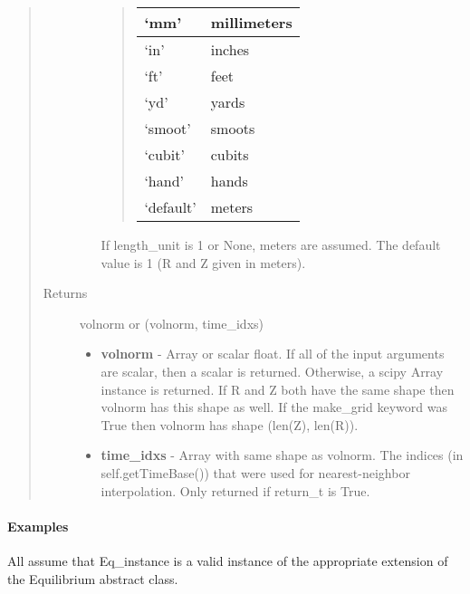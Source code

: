 \documentclass[letterpaper,10pt,english]{sphinxmanual}
\begin{document}
\begin{fulllineitems}
\begin{fulllineitems}
\begin{quote}
\begin{description}
\begin{itemize}
\begin{quote}
\begin{tabulary}{\linewidth}{|L|L|}
`mm'
 & 
millimeters
\\\hline

`in'
 & 
inches
\\\hline

`ft'
 & 
feet
\\\hline

`yd'
 & 
yards
\\\hline

`smoot'
 & 
smoots
\\\hline

`cubit'
 & 
cubits
\\\hline

`hand'
 & 
hands
\\\hline

`default'
 & 
meters
\\\hline
\end{tabulary}

\end{quote}

If length\_unit is 1 or None, meters are assumed. The default
value is 1 (R and Z given in meters).

\end{itemize}

\item[{Returns}] \leavevmode

volnorm or (volnorm, time\_idxs)
\begin{itemize}
\item {} 
\textbf{volnorm} - Array or scalar float. If all of the input arguments are
scalar, then a scalar is returned. Otherwise, a scipy Array
instance is returned. If R and Z both have the same shape then
volnorm has this shape as well. If the make\_grid keyword was
True then volnorm has shape (len(Z), len(R)).

\item {} 
\textbf{time\_idxs} - Array with same shape as volnorm. The indices (in
self.getTimeBase()) that were used for nearest-neighbor
interpolation. Only returned if return\_t is True.

\end{itemize}


\end{description}\end{quote}
\paragraph{Examples}

All assume that Eq\_instance is a valid instance of the appropriate
extension of the Equilibrium abstract class.


\end{fulllineitems}
\end{fulllineitems}
\end{document}
